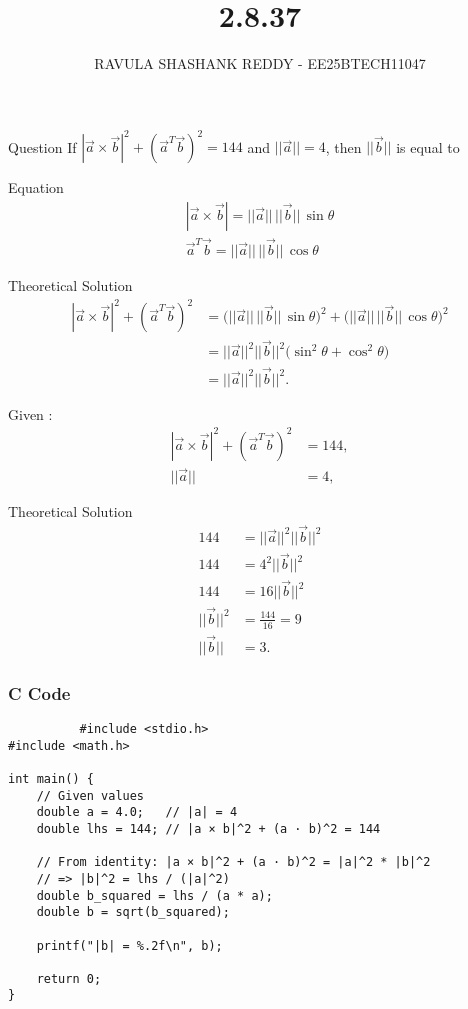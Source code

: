 \documentclass{beamer}
\title %
{2.8.37}
\author %
{RAVULA SHASHANK REDDY - EE25BTECH11047}
\begin{document}
	
	
	\frame{\titlepage}
	\begin{frame}{Question}
If $|\vec{a}\times \vec{b}|^2 + (\vec{a}^T \vec{b})^2 = 144$ and $||\vec{a}|| = 4$, then $||\vec{b}||$ is equal to \underline{\hspace{2cm}}\\
\end{frame}

\begin{frame}{Equation}
\begin{align*}
|\vec{a}\times \vec{b}|=||\vec{a}||\,||\vec{b}||\,\sin\theta \\
\vec{a}^T\vec{b}=||\vec{a}||\,||\vec{b}||\,\cos\theta 
\end{align*}
    
\end{frame}
\begin{frame}{Theoretical Solution}
    \begin{align}
|\vec{a}\times \vec{b}|^2 + (\vec{a}^T \vec{b})^2
&= \big(||\vec{a}||\,||\vec{b}||\,\sin\theta\big)^2 + \big(||\vec{a}||\,||\vec{b}||\,\cos\theta\big)^2 \\[6pt]
&= ||\vec{a}||^2||\vec{b}||^2\big(\sin^2\theta+\cos^2\theta\big) \\[6pt]
&= ||\vec{a}||^2||\vec{b}||^2.
\end{align}

Given :
\begin{align}
|\vec{a}\times \vec{b}|^2 + (\vec{a}^T \vec{b})^2 &= 144, \\
||\vec{a}|| &= 4,
\end{align}
\end{frame}
\begin{frame}{Theoretical Solution}
\begin{align}
144 &= ||\vec{a}||^2||\vec{b}||^2 \\
144 &= 4^2||\vec{b}||^2 \\
144 &= 16||\vec{b}||^2 \\
||\vec{b}||^2 &= \frac{144}{16} = 9 \\
||\vec{b}|| &= 3.
\end{align}

\end{frame}
\begin{frame}[fragile]
     \frametitle{C Code}
      \begin{lstlisting}
          #include <stdio.h>
#include <math.h>

int main() {
    // Given values
    double a = 4.0;   // |a| = 4
    double lhs = 144; // |a × b|^2 + (a · b)^2 = 144

    // From identity: |a × b|^2 + (a · b)^2 = |a|^2 * |b|^2
    // => |b|^2 = lhs / (|a|^2)
    double b_squared = lhs / (a * a);
    double b = sqrt(b_squared);

    printf("|b| = %.2f\n", b);

    return 0;
}
      \end{lstlisting}
\end{frame}
\end{document}
